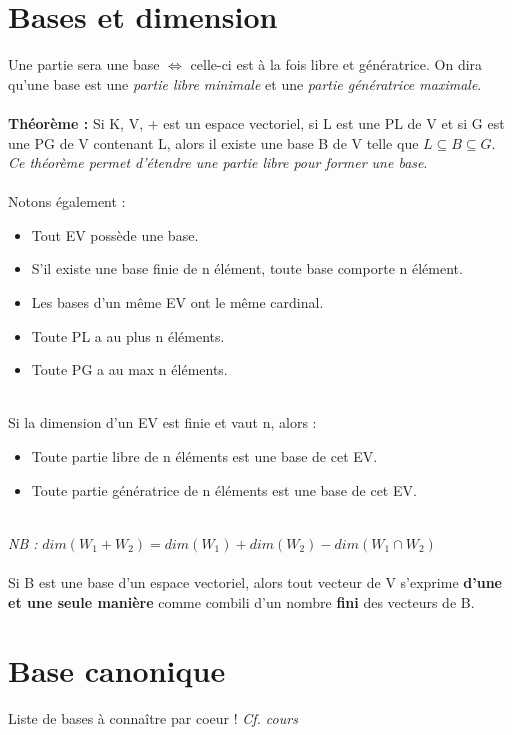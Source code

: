 \documentclass[british,french,11pt, a4paper, openany]{book}
\begin{document}
	\section{Bases et dimension}
	Une partie sera une base $\Leftrightarrow$ celle-ci est à la fois libre et génératrice. On dira qu'une base est une \textit{partie libre minimale} et une \textit{partie génératrice maximale}.\\\\
	\textbf{Théorème :} Si K, V, + est un espace vectoriel, si L est une PL de V et si G est une PG de V contenant L, alors il existe une base B de V telle que $L \subseteq B \subseteq G$.\\
	\textit{Ce théorème permet d'étendre une partie libre pour former une base}.\\\\
	Notons également :
	\begin{itemize}
		\item Tout EV possède une base.
		\item S'il existe une base finie de n élément, toute base comporte n élément.
		\item Les bases d'un même EV ont le même cardinal.
		\item Toute PL a au plus n éléments.
		\item Toute PG a au max n éléments.
	\end{itemize}
	\ \\
	Si la dimension d'un EV est finie et vaut n, alors :
	\begin{itemize}
		\item Toute partie libre de n éléments est une base de cet EV.
		\item Toute partie génératrice de n éléments est une base de cet EV.
	\end{itemize}
	\ \\
	\textit{NB :} $dim(W_{1} + W_{2}) = dim(W_{1}) + dim(W_{2}) - dim(W_{1} \cap W_{2})$\\\\
	Si B est une base d'un espace vectoriel, alors tout vecteur de V s'exprime \textbf{d'une et une seule manière} comme combili d'un nombre \textbf{fini} des vecteurs de B.
	
	\section{Base canonique}
	Liste de bases à connaître par coeur ! \textit{Cf. cours}
	
\end{document}
